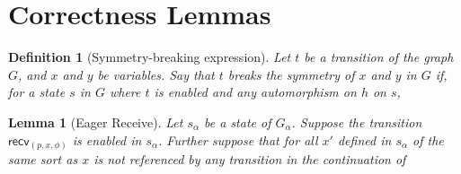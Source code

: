 \documentclass{article}
\newtheorem{lemma}{Lemma}
\newtheorem{definition}{Definition}
\newcommand{\abs}[1]{#1_{\alpha}}
\newcommand{\recv}[3]{\mathsf{recv}_{(#1,#2,#3)}}
\begin{document}
\section{Correctness Lemmas}
%
\begin{definition}[Symmetry-breaking expression]
  Let $t$ be a transition of the graph $G$, and $x$ and $y$ be
  variables. Say that $t$ breaks the symmetry of $x$ and $y$ in $G$
  if, for a state $s$ in $G$ where $t$ is enabled and any automorphism on $h$ on $s$,
  
\end{definition}
%
\begin{lemma}[Eager Receive]
  Let $\abs{s}$ be a state of $\abs{G}$. 
  Suppose the transition $\recv{p}{x}{\phi}$ is enabled in $\abs{s}$.
  Further suppose that for all $x'$ defined in $\abs{s}$ of the same sort as
  $x$ is not referenced by any transition in the continuation of 

\end{lemma}
\end{document}
